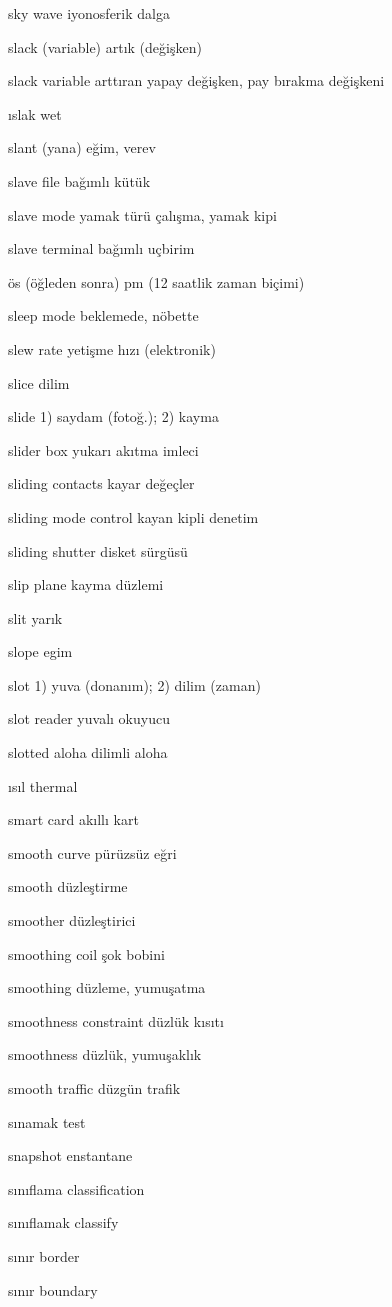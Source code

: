 \documentclass[12pt,fleqn]{article}\usepackage{../../common}
\begin{document}
sky wave iyonosferik dalga

slack (variable) artık (değişken)

slack variable arttıran yapay değişken, pay bırakma değişkeni

ıslak wet

slant (yana) eğim, verev

slave file bağımlı kütük

slave mode yamak türü çalışma, yamak kipi

slave terminal bağımlı uçbirim

ös (öğleden sonra) pm (12 saatlik zaman biçimi)

sleep mode beklemede, nöbette

slew rate yetişme hızı (elektronik)

slice dilim

slide 1) saydam (fotoğ.); 2) kayma

slider box yukarı akıtma imleci

sliding contacts kayar değeçler

sliding mode control kayan kipli denetim

sliding shutter disket sürgüsü

slip plane kayma düzlemi

slit yarık

slope egim

slot 1) yuva (donanım); 2) dilim (zaman)

slot reader yuvalı okuyucu

slotted aloha dilimli aloha

ısıl thermal

smart card akıllı kart

smooth curve pürüzsüz eğri

smooth düzleştirme

smoother düzleştirici

smoothing coil şok bobini

smoothing düzleme, yumuşatma

smoothness constraint düzlük kısıtı

smoothness düzlük, yumuşaklık

smooth traffic düzgün trafik

sınamak test

snapshot enstantane

sınıflama classification

sınıflamak classify

sınır border

sınır boundary
\end{document}
